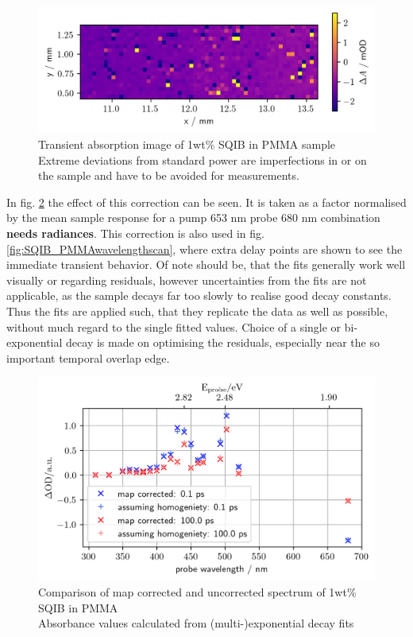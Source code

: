 \documentclass[twoside,openright]{scrreprt}
\begin{document}
\begin{figure}[hbtp]
\centering
\includegraphics[scale=1]{images/1percentSQIBinPMMA_Sample653-680Image.png}
\caption{Transient absorption image of 1wt\% SQIB in PMMA sample\\ Extreme deviations from standard power are imperfections in or on the sample and have to be avoided for measurements.\label{fig:TA_image_sample}}
\end{figure}

In fig. \ref{fig:TA-scan-map-vs-nomap} the effect of this correction can be seen. It is taken as a factor normalised by the mean sample response for a pump 653 nm probe 680 nm combination \textbf{needs radiances}. This correction is also used in fig. \ref{fig:SQIB_PMMAwavelengthscan}, where extra delay points are shown to see the immediate transient behavior. Of note should be, that the fits generally work well visually or regarding residuals, however uncertainties from the fits are not applicable, as the sample decays far too slowly to realise good decay constants. Thus the fits are applied such, that they replicate the data as well as possible, without much regard to the single fitted values. Choice of a single or bi-exponential decay is made on optimising the residuals, especially near the so important temporal overlap edge.

\begin{figure}[hbtp]
\centering
\includegraphics[scale=1]{images/TimeResolvedWavelengthScanSQIB1perc_PMMA.png}
\caption{Comparison of map corrected and uncorrected spectrum of 1wt\% SQIB in PMMA\label{fig:TA-scan-map-vs-nomap}\\
Absorbance values calculated from (multi-)exponential decay fits}
\end{figure}
\end{document}
